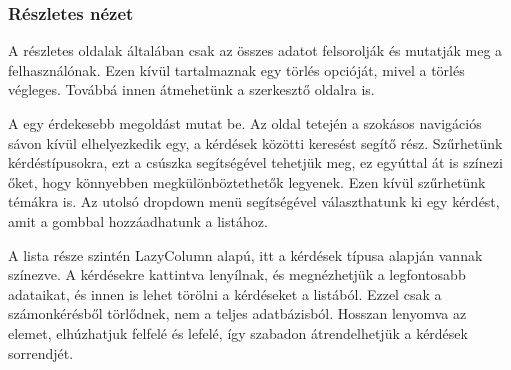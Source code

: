 \subsubsection{Részletes nézet}

A részletes oldalak általában csak az összes adatot felsorolják és mutatják meg a felhasználónak.
Ezen kívül tartalmaznak egy törlés opcióját, mivel a törlés végleges.
Továbbá innen átmehetünk a szerkesztő oldalra is.

A  egy érdekesebb megoldást mutat be.
Az oldal tetején a szokásos navigációs sávon kívül elhelyezkedik egy, a kérdések közötti keresést segítő rész.
Szűrhetünk kérdéstípusokra, ezt a csúszka segítségével tehetjük meg, ez egyúttal át is színezi őket, hogy könnyebben megkülönböztethetők legyenek.
Ezen kívül szűrhetünk témákra is.
Az utolsó dropdown menü segítségével választhatunk ki egy kérdést, amit a gombbal hozzáadhatunk a listához.

A lista része szintén LazyColumn alapú, itt a kérdések típusa alapján vannak színezve.
A kérdésekre kattintva lenyílnak, és megnézhetjük a legfontosabb adataikat, és innen is lehet törölni a kérdéseket a listából. Ezzel csak a számonkérésből törlődnek, nem a teljes adatbázisból.
Hosszan lenyomva az elemet, elhúzhatjuk felfelé és lefelé, így szabadon átrendelhetjük a kérdések sorrendjét.

\pagebreak

